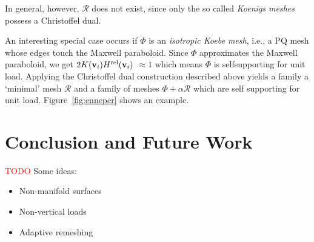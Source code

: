 \documentclass[annual]{acmsiggraph}
\def\rel{{\mathord{\text{\rm rel}}}}
\def\RR{{\mathcal R}}
\newcommand{\todo}[1]{\textcolor{red}{#1}}
\begin{document}
In general, however, $\RR$ does not exist, since only the so\dash
called {\em Koenigs meshes} possess a Christoffel dual.


An  interesting special case occurs if $\Phi$ is an
\emph{isotropic Koebe mesh}, i.e., a PQ mesh whose edges
touch the Maxwell paraboloid. Since $\Phi$ approximates the Maxwell
paraboloid, we get $2K(\vw_i)H^{\rel}(\vw_i)$ $ \approx 1$ which means
$\Phi$ is self\dash supporting for unit load. Applying the Christoffel
dual construction described above yields a family a `minimal' mesh
$\RR$ and a family of meshes $\Phi+\alpha\RR$ which are self\dash 
supporting for unit load. Figure~\ref{fig:enneper} shows an example.

\section{Conclusion and Future Work}

\todo{TODO}
Some ideas:
\begin{itemize}
\item{Non-manifold surfaces}
\item{Non-vertical loads}
\item{Adaptive remeshing}
\end{itemize}






\end{document}
